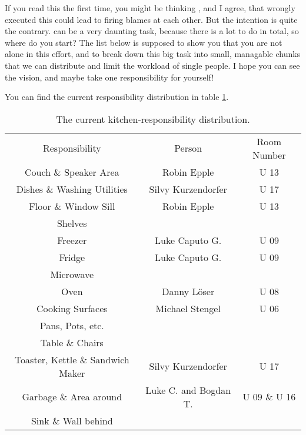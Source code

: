 If you read this the first time, you might be thinking , and I agree, that wrongly executed this could lead to firing blames at each other. But the intention is quite the contrary.  can be a very daunting task, because there is a lot to do in total, so where do you start? The list below is supposed to show you that you are not alone in this effort, and to break down this big task into small, managable chunks that we can distribute and limit the workload of single people. I hope you can see the vision, and maybe take one responsibility for yourself!

You can find the current responsibility distribution in table \ref{tab:kitchen-responsibilities}.

\begin{table}[htp]
    \centering
    \begin{tabular}{ccc}
        \cline{1-1}
        \rowcolor[HTML]{F89646} 
        Responsibility                    & Person                & Room Number  \\
        Couch \& Speaker Area             & Robin Epple           & U 13         \\ \hline
        Dishes \& Washing Utilities       & Silvy Kurzendorfer    & U 17         \\ \hline
        Floor \& Window Sill              & Robin Epple           & U 13         \\ \hline
        Shelves                           &                       &              \\ \hline
        Freezer                           & Luke Caputo G.        & U 09         \\ \hline
        Fridge                            & Luke Caputo G.        & U 09         \\ \hline
        Microwave                         &                       &              \\ \hline
        Oven                              & Danny Löser           & U 08         \\ \hline
        Cooking Surfaces                  & Michael Stengel       & U 06         \\ \hline
        Pans, Pots, etc.                  &                       &              \\ \hline
        Table \& Chairs                   &                       &              \\ \hline
        Toaster, Kettle \& Sandwich Maker & Silvy Kurzendorfer    & U 17         \\ \hline
        Garbage \& Area around            & Luke C. and Bogdan T. & U 09 \& U 16 \\ \hline
        Sink \& Wall behind               &                       &              \\ \hline
    \end{tabular}
    \caption{The current kitchen-responsibility distribution.}
    \label{tab:kitchen-responsibilities}
\end{table}

